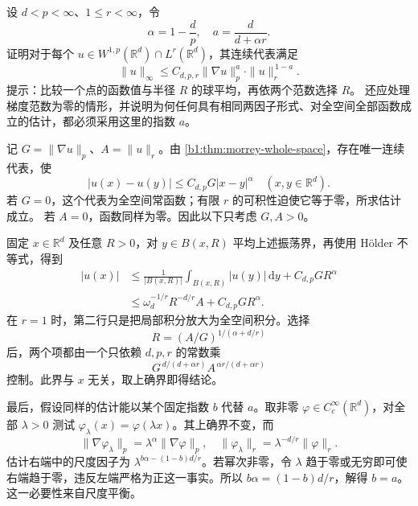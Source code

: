 \begin{exercise}\label{b1:ex:24-morrey-integrability-balance}
设 \(d<p<\infty\)、\(1\le r<\infty\)，令
\[
 \alpha=1-\frac dp,\quad
 a=\frac d{d+\alpha r}.
\]
证明对于每个
\(u\in W^{1,p}(\mathbb R^d)\cap L^r(\mathbb R^d)\)，其连续代表满足
\[
 \|u\|_\infty
    \le C_{d,p,r}\|\nabla u\|_p^a
                    \cdot\|u\|_r^{\,1-a}.
\]
提示：比较一个点的函数值与半径 \(R\) 的球平均，再依两个范数选择 \(R\)。
还应处理梯度范数为零的情形，并说明为何任何具有相同两因子形式、对全空间全部函数成立的估计，都必须采用这里的指数 \(a\)。
\end{exercise}
\begin{solution}
记 \(G=\|\nabla u\|_p\)、\(A=\|u\|_r\)。由%
\cref{b1:thm:morrey-whole-space}，存在唯一连续代表，使
\[
 |u(x)-u(y)|\le C_{d,p}G|x-y|^\alpha
                  \quad(x,y\in\mathbb R^d).
\]
若 \(G=0\)，这个代表为全空间常函数；有限 \(r\) 的可积性迫使它等于零，所求估计成立。
若 \(A=0\)，函数同样为零。因此以下只考虑 \(G,A>0\)。

固定 \(x\in\mathbb R^d\) 及任意 \(R>0\)，对 \(y\in B(x,R)\) 平均上述振荡界，再使用 Hölder 不等式，得到
\[
 \begin{aligned}
 |u(x)|
 &\le\frac1{|B(x,R)|}\int_{B(x,R)}|u(y)|\,\mathrm dy
                                  +C_{d,p}G R^\alpha\\
 &\le\omega_d^{-1/r}R^{-d/r}A+C_{d,p}G R^\alpha.
 \end{aligned}
\]
在 \(r=1\) 时，第二行只是把局部积分放大为全空间积分。选择
\[
 R=(A/G)^{1/(\alpha+d/r)}
\]
后，两个项都由一个只依赖 \(d,p,r\) 的常数乘
\[
 G^{\,d/(d+\alpha r)}A^{\,\alpha r/(d+\alpha r)}
\]
控制。此界与 \(x\) 无关，取上确界即得结论。

最后，假设同样的估计能以某个固定指数 \(b\) 代替 \(a\)。取非零
\(\varphi\in C_c^\infty(\mathbb R^d)\)，对全部 \(\lambda>0\) 测试
\(\varphi_\lambda(x)=\varphi(\lambda x)\)。其上确界不变，而
\[
 \|\nabla\varphi_\lambda\|_p
        =\lambda^\alpha\|\nabla\varphi\|_p,\quad
 \|\varphi_\lambda\|_r
        =\lambda^{-d/r}\|\varphi\|_r.
\]
估计右端中的尺度因子为 \(\lambda^{b\alpha-(1-b)d/r}\)。若幂次非零，令
\(\lambda\) 趋于零或无穷即可使右端趋于零，违反左端严格为正这一事实。所以
\(b\alpha=(1-b)d/r\)，解得 \(b=a\)。这一必要性来自尺度平衡。
\end{solution}

